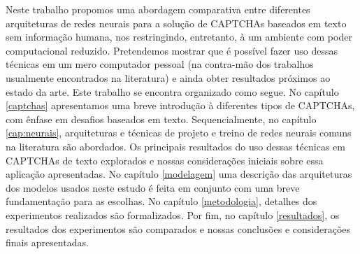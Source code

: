 Neste trabalho propomos uma abordagem comparativa entre diferentes arquiteturas de redes neurais para a solução de CAPTCHAs baseados em texto sem informação humana, nos restringindo, entretanto, à um ambiente com poder computacional reduzido. Pretendemos mostrar que é possível fazer uso dessas técnicas em um mero computador pessoal (na contra-mão dos trabalhos usualmente encontrados na literatura) e ainda obter resultados próximos ao estado da arte. Este trabalho se encontra organizado como segue. No capítulo \ref{captchas} apresentamos uma breve introdução à diferentes tipos de CAPTCHAs, com ênfase em desafios baseados em texto. Sequencialmente, no capítulo \ref{cap:neurais}, arquiteturas e técnicas de projeto e treino de redes neurais comuns na literatura são abordados. Os principais resultados do uso dessas técnicas em CAPTCHAs de texto explorados e nossas considerações iniciais sobre essa aplicação apresentadas. No capítulo \ref{modelagem} uma descrição das arquiteturas dos modelos usados neste estudo é feita em conjunto com uma breve fundamentação para as escolhas. No capítulo \ref{metodologia}, detalhes dos experimentos realizados são formalizados. Por fim, no capítulo \ref{resultados}, os resultados dos experimentos são comparados e nossas conclusões e considerações finais apresentadas. 

